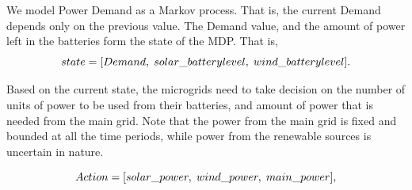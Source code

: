 \documentclass[conference]{IEEEtran}
\begin{document}
We model Power Demand as a Markov process. That is, the current Demand depends only on the previous value. The Demand value, and the amount of power left in the batteries form the state of the MDP. That is, 
\begin{equation}
 state = [Demand,\hspace{0.1cm} solar\_batterylevel,\hspace{0.1cm} wind\_batterylevel].
\end{equation}

Based on the current state, the microgrids need to take decision on the number of units of power to be used from their batteries, and amount of power that is needed from the main grid. Note that the power from the main grid is fixed and bounded at all the time periods, while power from the  renewable sources is uncertain in nature. 

\begin{equation}
Action = [solar\_power,\hspace{0.1cm} wind\_power,\hspace{0.1cm} main\_power],
\end{equation}
\end{document}
